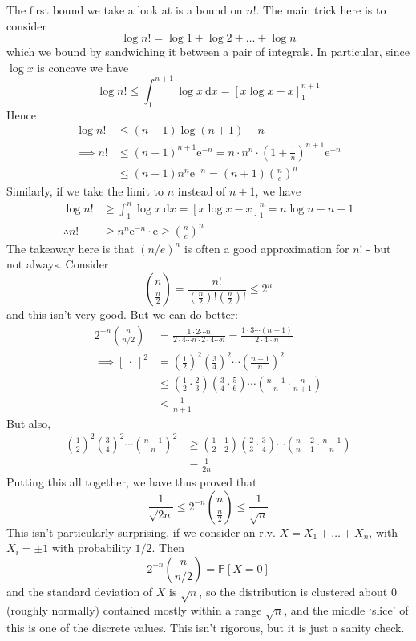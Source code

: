 \documentclass[]{article}
\theoremstyle{custhm}
\theoremstyle{cusdef}
\theoremstyle{custhm}
\theoremstyle{custhm}
\theoremstyle{custhm}
\theoremstyle{custhm}
\theoremstyle{cusdef}
\theoremstyle{remark}
\theoremstyle{custhm}
\newcommand{\e}{\mathrm{e}}
\renewcommand{\P}{\mathbb{P}}
\begin{document}
The first bound we take a look at is a bound on $n!$. The main trick here is to consider
\[
\log n! = \log 1 + \log 2 + \dots + \log n
\]
which we bound by sandwiching it between a pair of integrals. In particular, since $\log x$ is concave we have
\[
\log n! \le \int_{1}^{n+1}\log x\ \textrm{d}x = [x\log x - x]_{1}^{n+1}
\]
Hence
\begin{align*}
\log n! &\le (n+1)\log(n+1) - n\\
\implies n! &\le (n+1)^{n+1}\e^{-n}= n\cdot n^n\cdot\left(1+\frac{1}{n}\right)^{n+1}\e^{-n}\\
&\le (n+1)n^n\e^{-n} = (n+1)\left(\frac{n}{e}\right)^n
\end{align*}
Similarly, if we take the limit to $n$ instead of $n+1$, we have
\begin{align*}
\log n! &\ge \int_{1}^{n}\log x\ \textrm{d}x = [x\log x - x]_{1}^{n} = n\log n - n + 1\\
\therefore n! &\ge n^n\e^{-n}\cdot \e \ge \left(\frac{n}{e}\right)^n 
\end{align*}
The takeaway here is that $(n/e)^n$ is often a good approximation for $n!$ - but not always. Consider
\[
\binom{n}{\frac{n}{2}}  = \frac {n!}{\left(\frac{n}{2}\right)!\left(\frac{n}{2}\right)!}\le 2^n
\]
and this isn't very good. But we can do better:
\begin{align*}
2^{-n}\binom{n}{n/2} &= \frac{1\cdot 2\cdots n}{2\cdot 4\cdots n\cdot 2\cdot 4\cdots n} = \frac{1\cdot3\cdots (n-1)}{2\cdot 4\cdots n}\\
\implies [\ \cdot\ ]^2 &= \left(\frac{1}{2}\right)^2\left(\frac{3}{4}\right)^2\cdots\left(\frac{n-1}{n}\right)^2\\
&\le \left(\frac{1}{2}\cdot\frac{2}{3}\right)\left(\frac{3}{4}\cdot\frac{5}{6}\right)\cdots\left(\frac{n-1}{n}\cdot\frac{n}{n+1}\right)\\
&\le \frac{1}{n+1}
\end{align*}
But also,
\begin{align*}
\left(\frac{1}{2}\right)^2\left(\frac{3}{4}\right)^2\cdots\left(\frac{n-1}{n}\right)^2 &\ge \left(\frac{1}{2}\cdot\frac{1}{2}\right)\left(\frac{2}{3}\cdot\frac{3}{4}\right)\cdots\left(\frac{n-2}{n-1}\cdot\frac{n-1}{n}\right)\\
&= \frac{1}{2n}
\end{align*}
Putting this all together, we have thus proved that
\[
\frac{1}{\sqrt{2n}} \le 2^{-n}\binom{n}{\frac{n}{2}} \le \frac{1}{\sqrt{n}}
\]
This isn't particularly surprising, if we consider an r.v. $X = X_1+\dots + X_n$, with $X_i = \pm 1$ with probability $1/2$. Then
\[
2^{-n}\binom{n}{n/2} = \P[X = 0]
\]
and the standard deviation of $X$ is $\sqrt{n}$, so the distribution is clustered about $0$ (roughly normally) contained mostly within a range $\sqrt{n}$, and the middle `slice' of this is one of the discrete values. This isn't rigorous, but it is just a sanity check.
\end{document}
